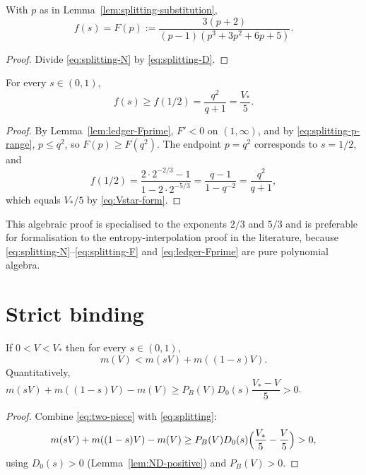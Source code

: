 \begin{lemma}[$f$ as a function of $p$]\label{lem:splitting-F}
With $p$ as in Lemma~\ref{lem:splitting-substitution},
\begin{equation}\label{eq:splitting-F}
  f(s)=F(p):=\frac{3(p+2)}{(p-1)(p^3+3p^2+6p+5)} .
\end{equation}
\end{lemma}

\begin{proof}
Divide \eqref{eq:splitting-N} by \eqref{eq:splitting-D}.
\end{proof}

\begin{theorem}\label{thm:splitting}
For every $s\in(0,1)$,
\begin{equation}\label{eq:splitting}
  f(s)\ge f(1/2)=\frac{q^2}{q+1}=\frac{V_*}{5}.
\end{equation}
\end{theorem}

\begin{proof}
By Lemma~\ref{lem:ledger-Fprime}, $F'<0$ on $(1,\infty)$, and by
\eqref{eq:splitting-p-range}, $p\le q^2$, so $F(p)\ge F(q^2)$.  The endpoint
$p=q^2$ corresponds to $s=1/2$, and
\[
  f(1/2)=\frac{2\cdot2^{-2/3}-1}{1-2\cdot2^{-5/3}}
        =\frac{q-1}{1-q^{-2}}
        =\frac{q^2}{q+1},
\]
which equals $V_*/5$ by \eqref{eq:Vstar-form}.
\end{proof}

\begin{fnote}\label{fnote:splitting-choice}
This algebraic proof is specialised to the exponents $2/3$ and $5/3$ and is
preferable for formalisation to the entropy-interpolation proof in the
literature, because \eqref{eq:splitting-N}--\eqref{eq:splitting-F} and
\eqref{eq:ledger-Fprime} are pure polynomial algebra.
\end{fnote}

\section{Strict binding}

\begin{proposition}\label{prop:strict-binding}
If $0<V<V_*$ then for every $s\in(0,1)$,
\begin{equation}\label{eq:strict-binding}
  m(V)<m(sV)+m((1-s)V).
\end{equation}
Quantitatively,
$m(sV)+m((1-s)V)-m(V)\ge P_B(V)D_0(s)\dfrac{V_*-V}{5}>0$.
\end{proposition}

\begin{proof}
Combine \eqref{eq:two-piece} with \eqref{eq:splitting}:
\[
  m(sV)+m((1-s)V)-m(V)
  \ge P_B(V)D_0(s)\Bigl(\frac{V_*}5-\frac V5\Bigr)>0 ,
\]
using $D_0(s)>0$ (Lemma~\ref{lem:ND-positive}) and $P_B(V)>0$.
\end{proof}


